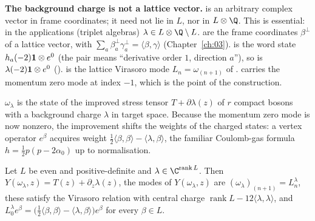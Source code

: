 \begin{dictionary}
\textbf{The background charge is not a lattice vector.}  is an arbitrary complex vector
in frame coordinates; it need not lie in $L$, nor in $L\otimes\Q$. This is essential: in the applications
(triplet algebras) $\lambda\in L\otimes\Q\setminus L$.  are the frame coordinates $\beta^\perp$
of a lattice vector, with $\sum_a\beta^\perp_a\gamma^\perp_a=\langle\beta,\gamma\rangle$ (Chapter~\ref{ch:03}).
 is the word state $h_a(-2)\mathbf{1}\otimes e^0$ (the pair  means
``derivative order $1$, direction $a$''), so  is $\lambda(-2)\mathbf{1}\otimes e^0$
().  is the lattice Virasoro mode $L_n=\omega_{(n+1)}$ of
.  carries the momentum zero mode at index $-1$, which is the point of the
construction.
\end{dictionary}

\begin{physics}
$\omega_\lambda$ is the state of the improved stress tensor $T+\partial\lambda(z)$ of $r$ compact bosons with a background
charge $\lambda$ in target space. Because the momentum zero mode is now nonzero, the improvement shifts the weights of
the charged states: a vertex operator $e^\beta$ acquires weight $\frac12\langle\beta,\beta\rangle-\langle\lambda,\beta\rangle$, the
familiar Coulomb-gas formula $h=\frac12p(p-2\alpha_0)$ up to normalisation.
\end{physics}

\begin{theorem}\label{l05:thm:latbg}
Let $L$ be even and positive-definite and $\lambda\in\C^{\operatorname{rank}L}$. Then
$Y(\omega_\lambda,z)=T(z)+\partial_z\lambda(z)$, the modes of $Y(\omega_\lambda,z)$ are $(\omega_\lambda)_{(n+1)}=L^\lambda_n$, these
satisfy the Virasoro relation with central charge $\operatorname{rank}L-12\langle\lambda,\lambda\rangle$, and
$L^\lambda_0e^\beta=\big(\frac12\langle\beta,\beta\rangle-\langle\lambda,\beta\rangle\big)e^\beta$ for every $\beta\in L$.
\end{theorem}

